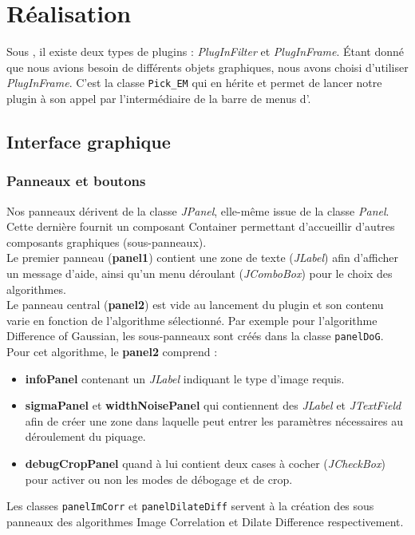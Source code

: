 \newsavebox{\fmbox}
\newenvironment{fmpage}[1]
     {\begin{lrbox}{\fmbox}\begin{minipage}{#1}}
     {\end{minipage}\end{lrbox}\fbox{\usebox{\fmbox}}}

\chapter{Réalisation}

Sous \imj, il existe deux types de plugins : \emph{PlugInFilter} et \emph{PlugInFrame}. Étant donné que nous avions besoin de différents objets graphiques, nous avons choisi d'utiliser \emph{PlugInFrame}. C'est la classe \texttt{Pick\_EM} qui en hérite et permet de lancer notre plugin à son appel par l'intermédiaire de la barre de menus d'\imj.

\section{Interface graphique}

\subsection{Panneaux et boutons}

Nos panneaux dérivent de la classe \emph{JPanel}, elle-même issue de la classe \emph{Panel}. Cette dernière fournit un composant Container permettant d'accueillir d'autres composants graphiques (sous-panneaux).\\

Le premier panneau (\textbf{panel1}) contient une zone de texte (\emph{JLabel}) afin d'afficher un message d'aide, ainsi qu'un menu déroulant (\emph{JComboBox}) pour le choix des algorithmes. \\

Le panneau central (\textbf{panel2}) est vide au lancement du plugin et son contenu varie en fonction de l'algorithme sélectionné. Par exemple pour l'algorithme Difference of Gaussian, les sous-panneaux sont créés dans la classe \texttt{panelDoG}. Pour cet algorithme, le \textbf{panel2} comprend :
\begin{itemize}
\item \textbf{infoPanel} contenant un \emph{JLabel} indiquant le type d'image requis.
\item \textbf{sigmaPanel} et \textbf{widthNoisePanel} qui contiennent des \emph{JLabel} et \emph{JTextField} afin de créer une zone dans laquelle peut entrer les paramètres nécessaires au déroulement du piquage. 
\item \textbf{debugCropPanel} quand à lui contient deux cases à cocher (\emph{JCheckBox}) pour activer ou non les modes de débogage et de crop. 
\end{itemize}
Les classes \texttt{panelImCorr} et \texttt{panelDilateDiff} servent à la création des sous panneaux des algorithmes Image Correlation et Dilate Difference respectivement. \\

